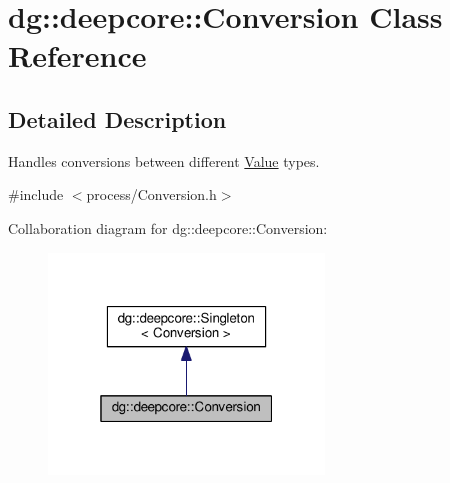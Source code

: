 \hypertarget{classdg_1_1deepcore_1_1_conversion}{}\section{dg\+:\+:deepcore\+:\+:Conversion Class Reference}
\label{classdg_1_1deepcore_1_1_conversion}


\subsection{Detailed Description}
Handles conversions between different \hyperlink{classdg_1_1deepcore_1_1_value}{Value} types. 

{\ttfamily \#include $<$process/\+Conversion.\+h$>$}



Collaboration diagram for dg\+:\+:deepcore\+:\+:Conversion\+:
\nopagebreak
\begin{figure}[H]
\begin{center}
\leavevmode
\includegraphics[width=208pt]{classdg_1_1deepcore_1_1_conversion__coll__graph}
\end{center}
\end{figure}
